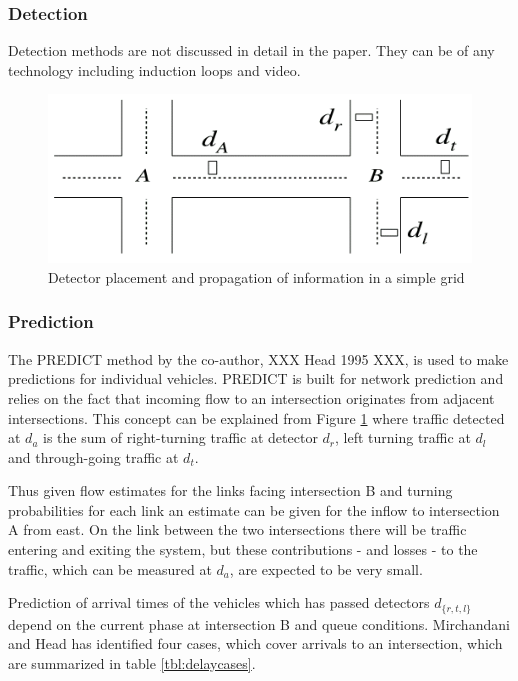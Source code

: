 \subsubsection*{Detection}
Detection methods are not discussed in detail in the paper. They can
be of any technology including induction loops and video.

\begin{figure}[!ht]
\begin{center}
\includegraphics[scale=0.5]{rhodes_prediction-strategy.png} 
\end{center}
\caption{Detector placement and propagation of information in a simple grid}
\label{fig:rhodes_predict}
\end{figure}

\subsubsection*{Prediction}
The PREDICT method by the co-author, XXX Head 1995 XXX, is used to make
predictions for individual vehicles. PREDICT is built for network
prediction and relies on the fact that incoming flow to an
intersection originates from adjacent intersections. This concept can
be explained from Figure \ref{fig:rhodes_predict} where traffic
detected at $d_a$ is the sum of right-turning traffic at detector
$d_r$, left turning traffic at $d_l$ and through-going traffic at
$d_t$.

Thus given flow estimates for the links facing intersection B and
turning probabilities for each link an estimate can be given for the
inflow to intersection A from east. On the link between the two
intersections there will be traffic entering and exiting the system,
but these contributions - and losses - to the traffic, which can be
measured at $d_a$, are expected to be very small.

Prediction of arrival times of the vehicles which has passed detectors
$d_{\lbrace r,t,l \rbrace}$ depend on the current phase at
intersection B and queue conditions. Mirchandani and Head has
identified four cases, which cover arrivals to an intersection, which
are summarized in table \ref{tbl:delaycases}.

